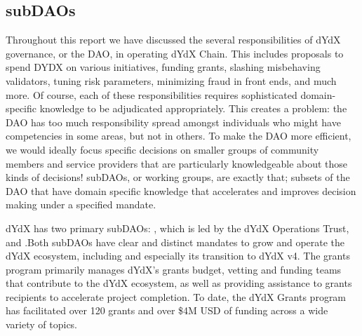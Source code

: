     \subsection{subDAOs} \label{subsec:subDAOs}

        Throughout this report we have discussed the several responsibilities of dYdX governance, or the DAO, in operating dYdX Chain. This includes proposals to spend DYDX on various initiatives, funding grants, slashing misbehaving validators, tuning risk parameters, minimizing fraud in front ends, and much more. Of course, each of these responsibilities requires sophisticated domain-specific knowledge to be adjudicated appropriately. This creates a problem: the DAO has too much responsibility spread amongst individuals who might have competencies in some areas, but not in others. To make the DAO more efficient, we would ideally focus specific decisions on smaller groups of community members and service providers that are particularly knowledgeable about those kinds of decisions! subDAOs, or working groups, are exactly that; subsets of the DAO that have domain specific knowledge that accelerates and improves decision making under a specified mandate.

        dYdX has two primary subDAOs: , which is led by the dYdX Operations Trust, and .Both subDAOs have clear and distinct mandates to grow and operate the dYdX ecosystem, including and especially its transition to dYdX v4. The grants program primarily manages dYdX's grants budget, vetting and funding teams that contribute to the dYdX ecosystem, as well as providing assistance to grants recipients to accelerate project completion. To date, the dYdX Grants program has facilitated over 120 grants and over \$4M USD of funding across a wide variety of topics.
        

